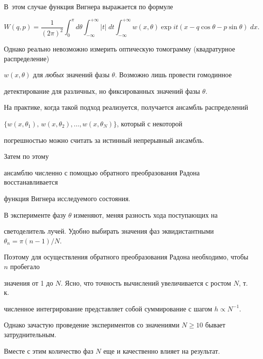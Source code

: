  В~этом случае функция Вигнера выражается по формуле

\begin{equation}

W(q,p)=\frac{1}{(2\pi)^2}\int_{0}^{\pi}d\theta

\int_{-\infty}^{+\infty}|t|\;dt\int_{-\infty}^{+\infty}w(x,\theta)\exp{it(x-q\cos\theta -p\sin\theta )}\;dx.

\end{equation}



Однако реально невозможно измерить оптическую томограмму (квадратурное распределение)

 $w(x,\theta)$ для {\it{любых}} значений фазы $\theta$. Возможно лишь провести гомодинное

 детектирование для различных, но фиксированных значений фазы $\theta$. 

 На практике, когда такой подход реализуется, получается ансамбль распределений 

 $\{w(x,\theta_1),\,w(x,\theta_2),\dots, w(x,\theta_{N})\}$, который с некоторой 

 погрешностью можно считать за истинный непрерывный ансамбль. 

 Затем по этому

 ансамблю численно с помощью обратного преобразования Радона восстанавливается 

 функция Вигнера исследуемого состояния.

 

В эксперименте фазу $\theta$ изменяют, меняя разность хода поступающих на 

светоделитель лучей. Удобно выбирать значения фаз эквидистантными $\theta_n={\pi (n-1)}/{N}$.

 Поэтому для осуществления обратного преобразования Радона необходимо, чтобы $n$ пробегало

 значения от 1 до $N$. Ясно, что точность вычислений увеличивается с ростом $N$, т. к.

 численное интегрирование представляет собой суммирование с шагом $h \propto N^{-1}$.

  Однако зачастую проведение экспериментов со значениями $N\geqslant 10$ бывает затруднительным.







Вместе с этим количество фаз $N$ еще и качественно влияет на результат. 

